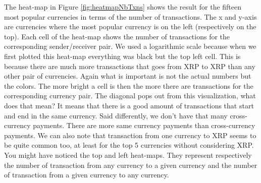 The heat-map in Figure \ref{fig:heatmapNbTxns} shows the result for the fifteen most popular currencies in terms of the number of transactions. The x and y-axis are currencies where the most popular currency is on the left (respectively on the top). Each cell of the heat-map shows the number of transactions for the corresponding sender/receiver pair. We used a logarithmic scale because when we first plotted this heat-map everything was black but the top left cell. This is because there are much more transactions that goes from XRP to XRP than any other pair of currencies. Again what is important is not the actual numbers but the colors. The more bright a cell is then the more there are transactions for the corresponding currency pair. The diagonal pops out from this visualization, what does that mean? It means that there is a good amount of transactions that start and end in the same currency. Said differently, we don't have that many cross-currency payments. There are more same currency payments than cross-currency payments. We can also note that transaction from one currency to XRP seems to be quite common too, at least for the top 5 currencies without considering XRP. You might have noticed the top and left heat-maps. They represent respectively the number of transaction from any currency to a given currency and the number of transaction from a given currency to any currency.

